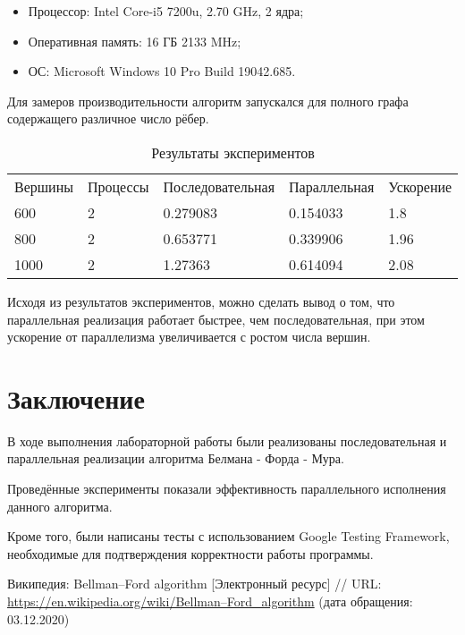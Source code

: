 \documentclass{report}
\begin{document}
\begin{itemize}
\item Процессор: Intel Core-i5 7200u, 2.70 GHz, 2 ядра;
\item Оперативная память: 16 ГБ 2133 MHz;
\item ОС: Microsoft Windows 10 Pro Build 19042.685.
\end{itemize}

\par Для замеров производительности алгоритм запускался для полного графа содержащего различное число рёбер.

\begin{table}[!h]
\caption{Результаты экспериментов}
\centering
\begin{tabular}{lllll}
Вершины & Процессы & Последовательная & Параллельная & Ускорение \\
600         & 2        & 0.279083        & 0.154033     & 1.8    \\
800         & 2        & 0.653771        & 0.339906     & 1.96   \\
1000        & 2        & 1.27363         & 0.614094     & 2.08   \\
\end{tabular}
\end{table}

\par Исходя из результатов экспериментов, можно сделать вывод о том, что параллельная реализация работает быстрее, чем последовательная, при этом ускорение от параллелизма увеличивается с ростом числа вершин.
\newpage

\section*{Заключение}
В ходе выполнения лабораторной работы были реализованы последовательная и параллельная реализации алгоритма Белмана - Форда - Мура.
\par Проведённые эксперименты показали эффективность параллельного исполнения данного алгоритма.
\par Кроме того, были написаны тесты с использованием Google Testing Framework, необходимые для подтверждения корректности работы программы.
\newpage

\begin{thebibliography}{1}
 Википедия: Bellman–Ford algorithm [Электронный ресурс] // URL: \url {https://en.wikipedia.org/wiki/Bellman–Ford_algorithm} (дата обращения: 03.12.2020)
\end{thebibliography}
\newpage
\end{document}
